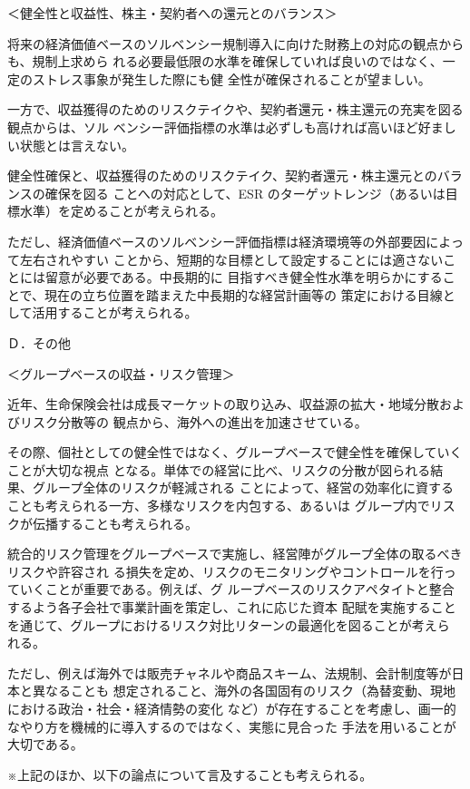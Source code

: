 \documentclass[report,gutter=10mm,fore-edge=10mm,uplatex,dvipdfmx]{jlreq}
\begin{document}
＜健全性と収益性、株主・契約者への還元とのバランス＞

 将来の経済価値ベースのソルベンシー規制導入に向けた財務上の対応の観点からも、規制上求めら
れる必要最低限の水準を確保していれば良いのではなく、一定のストレス事象が発生した際にも健
全性が確保されることが望ましい。

 一方で、収益獲得のためのリスクテイクや、契約者還元・株主還元の充実を図る観点からは、ソル
ベンシー評価指標の水準は必ずしも高ければ高いほど好ましい状態とは言えない。

 健全性確保と、収益獲得のためのリスクテイク、契約者還元・株主還元とのバランスの確保を図る
ことへの対応として、ESR のターゲットレンジ（あるいは目標水準）を定めることが考えられる。

 ただし、経済価値ベースのソルベンシー評価指標は経済環境等の外部要因によって左右されやすい
ことから、短期的な目標として設定することには適さないことには留意が必要である。中長期的に
目指すべき健全性水準を明らかにすることで、現在の立ち位置を踏まえた中長期的な経営計画等の
策定における目線として活用することが考えられる。

Ｄ．その他

＜グループベースの収益・リスク管理＞

 近年、生命保険会社は成長マーケットの取り込み、収益源の拡大・地域分散およびリスク分散等の
観点から、海外への進出を加速させている。

 その際、個社としての健全性ではなく、グループベースで健全性を確保していくことが大切な視点
となる。単体での経営に比べ、リスクの分散が図られる結果、グループ全体のリスクが軽減される
ことによって、経営の効率化に資することも考えられる一方、多様なリスクを内包する、あるいは
グループ内でリスクが伝播することも考えられる。

 統合的リスク管理をグループベースで実施し、経営陣がグループ全体の取るべきリスクや許容され
る損失を定め、リスクのモニタリングやコントロールを行っていくことが重要である。例えば、グ
ループベースのリスクアペタイトと整合するよう各子会社で事業計画を策定し、これに応じた資本
配賦を実施することを通じて、グループにおけるリスク対比リターンの最適化を図ることが考えら
れる。

 ただし、例えば海外では販売チャネルや商品スキーム、法規制、会計制度等が日本と異なることも
想定されること、海外の各国固有のリスク（為替変動、現地における政治・社会・経済情勢の変化
など）が存在することを考慮し、画一的なやり方を機械的に導入するのではなく、実態に見合った
手法を用いることが大切である。

※上記のほか、以下の論点について言及することも考えられる。
\end{document}
